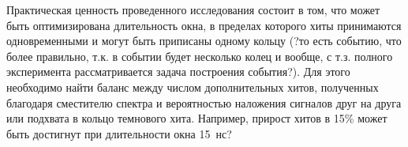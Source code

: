 Практическая ценность проведенного исследования состоит в том, что может быть оптимизирована длительность окна, в пределах которого хиты принимаются одновременными и могут быть приписаны одному кольцу (?то есть событию, что более правильно, т.к. в событии будет несколько колец и вообще, с т.з. полного эксперимента рассматривается задача построения события?). Для этого необходимо найти баланс между числом дополнительных хитов, полученных благодаря сместителю спектра и вероятностью наложения сигналов друг на друга или подхвата в кольцо темнового хита.
Например, прирост хитов в 15\% может быть достигнут при длительности окна 15~нс?